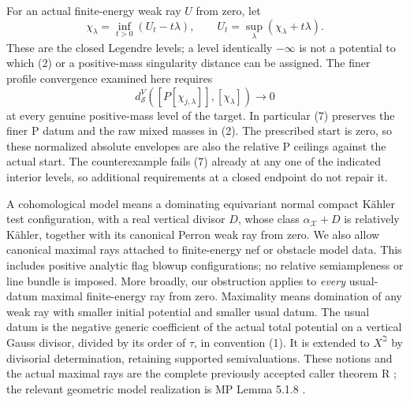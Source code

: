 \documentclass[11pt]{article}
\newcommand{\ds}{d_{\mathcal S}}
\begin{document}
For an actual finite-energy weak ray $U$ from zero, let
\[
 \chi_\lambda=\inf_{t>0}(U_t-t\lambda),\qquad
 U_t=\sup_\lambda(\chi_\lambda+t\lambda).                    \tag{6}
\]
These are the closed Legendre levels; a level identically $-\infty$
is not a potential to which (2) or a positive-mass singularity distance
can be assigned. The finer profile convergence examined here requires
\[
 \ds^V([P[\chi_{j,\lambda}]],[\chi_\lambda])\longrightarrow0
                                                               \tag{7}
\]
at every genuine positive-mass level of the target. In particular (7)
preserves the finer P datum and the raw mixed masses in (2).
The prescribed start is zero, so these normalized absolute envelopes
are also the relative P ceilings against the actual start.
The counterexample fails (7) already at any one of the indicated
interior levels, so additional requirements at a closed endpoint do
not repair it.

A cohomological model means a dominating equivariant normal compact
K\"ahler test configuration, with a real vertical divisor $D$, whose
class $\alpha_{\mathcal X}+D$ is relatively K\"ahler, together with its
canonical Perron weak ray from zero. We also allow canonical maximal
rays attached to finite-energy nef or obstacle model data. This includes
positive analytic flag blowup configurations; no relative semiampleness
or line bundle is imposed. More broadly, our obstruction applies to
\emph{every} usual-datum maximal finite-energy ray from zero.
Maximality means domination of any weak ray with smaller initial
potential and smaller usual datum. The usual datum is the negative
generic coefficient of the actual total potential on a vertical Gauss
divisor, divided by its order of $\tau$, in convention (1).
It is extended to $X^\beth$ by divisorial determination, retaining
supported semivaluations. These notions and the actual maximal rays
are the complete previously accepted caller theorem R \cite{R};
the relevant geometric model realization is MP Lemma 5.1.8 \cite{MP}.
\end{document}

